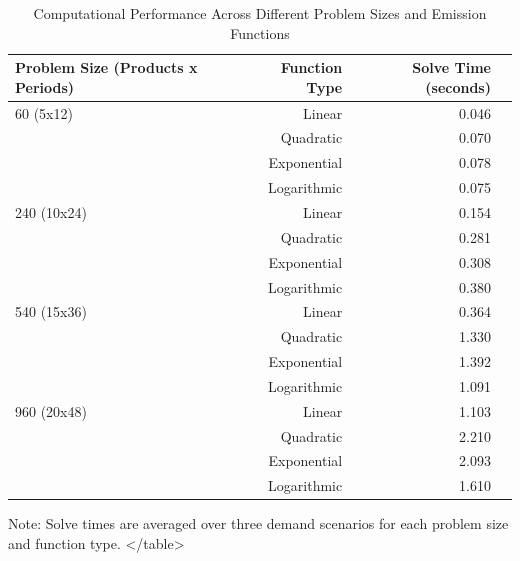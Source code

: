 \begin{table}[htbp]
\begin{table}[htbp]
    \centering
    \caption{Computational Performance Across Different Problem Sizes and Emission Functions}
    \label{tab:tab:computational_performance}
    \begin{tabular}{lrrr}
        \toprule
        Problem Size (Products x Periods) & Function Type & Solve Time (seconds) \\
        \midrule
        60 (5x12) & Linear & 0.046 \\
        & Quadratic & 0.070 \\
        & Exponential & 0.078 \\
        & Logarithmic & 0.075 \\
        \midrule
        240 (10x24) & Linear & 0.154 \\
        & Quadratic & 0.281 \\
        & Exponential & 0.308 \\
        & Logarithmic & 0.380 \\
        \midrule
        540 (15x36) & Linear & 0.364 \\
        & Quadratic & 1.330 \\
        & Exponential & 1.392 \\
        & Logarithmic & 1.091 \\
        \midrule
        960 (20x48) & Linear & 1.103 \\
        & Quadratic & 2.210 \\
        & Exponential & 2.093 \\
        & Logarithmic & 1.610 \\
        \bottomrule
    \end{tabular}
    \footnotesize{Note: Solve times are averaged over three demand scenarios for each problem size and function type.}
</table>


\end{table}
\end{table}
